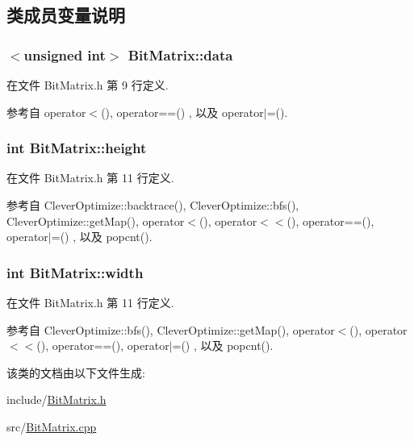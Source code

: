 \subsection{类成员变量说明}
\subsubsection[{\texorpdfstring{data}{data}}]{$<$unsigned int$>$ Bit\+Matrix\+::data\hspace{0.3cm}{\ttfamily [private]}}\hypertarget{classBitMatrix_a8a914444d9945c79a7e3cc88a49ef928}{}\label{classBitMatrix_a8a914444d9945c79a7e3cc88a49ef928}


在文件 Bit\+Matrix.\+h 第 9 行定义.



参考自 operator$<$(), operator==() , 以及 operator$\vert$=().

\subsubsection[{\texorpdfstring{height}{height}}]{\setlength{\rightskip}{0pt plus 5cm}int Bit\+Matrix\+::height}\hypertarget{classBitMatrix_a3b7a1be96313cacfd3b2a08661dd919c}{}\label{classBitMatrix_a3b7a1be96313cacfd3b2a08661dd919c}


在文件 Bit\+Matrix.\+h 第 11 行定义.



参考自 Clever\+Optimize\+::backtrace(), Clever\+Optimize\+::bfs(), Clever\+Optimize\+::get\+Map(), operator$<$(), operator$<$$<$(), operator==(), operator$\vert$=() , 以及 popcnt().

\subsubsection[{\texorpdfstring{width}{width}}]{\setlength{\rightskip}{0pt plus 5cm}int Bit\+Matrix\+::width}\hypertarget{classBitMatrix_ac271de23ac5446a0a75ee457a385d882}{}\label{classBitMatrix_ac271de23ac5446a0a75ee457a385d882}


在文件 Bit\+Matrix.\+h 第 11 行定义.



参考自 Clever\+Optimize\+::bfs(), Clever\+Optimize\+::get\+Map(), operator$<$(), operator$<$$<$(), operator==(), operator$\vert$=() , 以及 popcnt().



该类的文档由以下文件生成\+:\begin{DoxyCompactItemize}
\item 
include/\hyperlink{BitMatrix_8h}{Bit\+Matrix.\+h}\item 
src/\hyperlink{BitMatrix_8cpp}{Bit\+Matrix.\+cpp}\end{DoxyCompactItemize}
